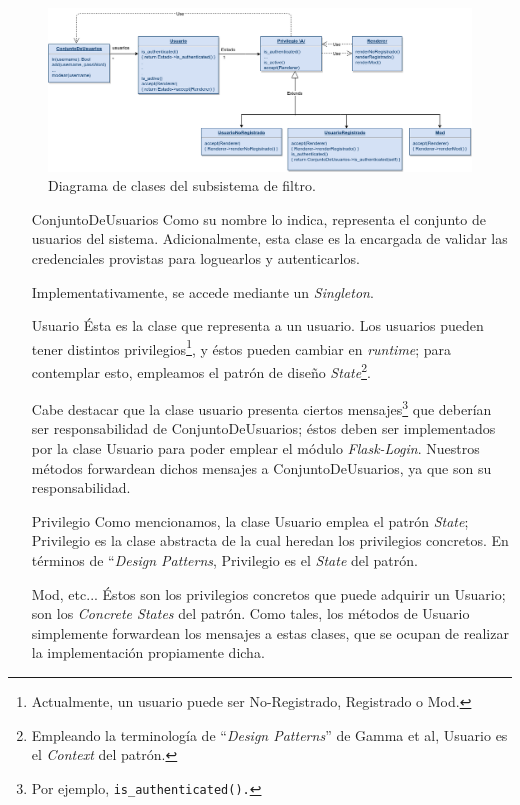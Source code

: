 \begin{figure}[H]
  \centering
  \includegraphics[width=\textwidth]{diagramas/usuario_clases.png}
  \caption{\normalfont Diagrama de clases del subsistema de filtro.}
\end{figure}

\begin{itemize}
\item[ConjuntoDeUsuarios] Como su nombre lo indica, representa el conjunto de usuarios del sistema. Adicionalmente, esta clase es la encargada de validar las credenciales provistas para loguearlos y autenticarlos.
    \par Implementativamente, se accede mediante un \textit{Singleton}.
\item[Usuario] Ésta es la clase que representa a un usuario. 
    Los usuarios pueden tener distintos privilegios\footnote{Actualmente, un usuario puede ser No-Registrado, Registrado o Mod.}, y éstos pueden cambiar en \textit{runtime}; para contemplar esto, empleamos el patrón de diseño \textit{State}\footnote{Empleando la terminología de ``\textit{Design Patterns}'' de Gamma et al, Usuario es el \textit{Context} del patrón.}.
        \par Cabe destacar que la clase usuario presenta ciertos mensajes\footnote{Por ejemplo, \tt{is\_authenticated()}.} que deberían ser responsabilidad de ConjuntoDeUsuarios; éstos deben ser implementados por la clase Usuario para poder emplear el módulo \textit{Flask-Login}.
        Nuestros métodos forwardean dichos mensajes a ConjuntoDeUsuarios, ya que son su responsabilidad.
    \item[Privilegio] Como mencionamos, la clase Usuario emplea el patrón \textit{State}; Privilegio es la clase abstracta de la cual heredan los privilegios concretos. En términos de ``\textit{Design Patterns}, Privilegio es el \textit{State} del patrón.
    \item[Mod, etc...] Éstos son los privilegios concretos que puede adquirir un Usuario; son los \textit{Concrete States} del patrón. Como tales, los métodos de Usuario simplemente forwardean los mensajes a estas clases, que se ocupan de realizar la implementación propiamente dicha.

\end{itemize}
